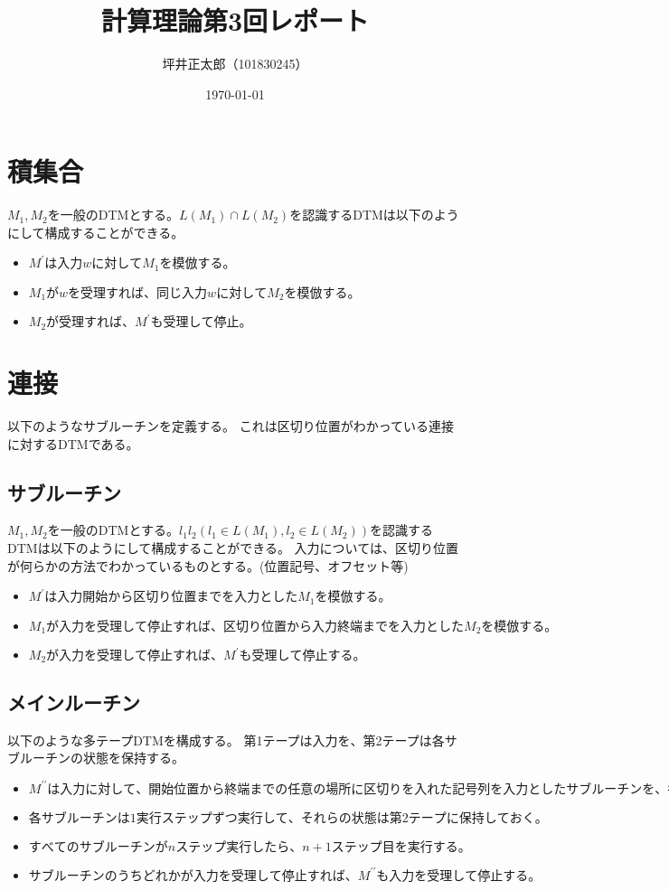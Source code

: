 \documentclass[a4paper,10pt]{jsarticle}
\begin{document}
\title{計算理論第3回レポート}
\author{坪井正太郎（101830245）}
\date{\today}
\maketitle
\section{積集合}
$M_1, M_2$を一般のDTMとする。$L(M_1)\cap L(M_2)$を認識するDTMは以下のようにして構成することができる。
\begin{itemize}
  \item $M^\prime は入力wに対してM_1を模倣する。$
  \item $M_1がwを受理すれば、同じ入力wに対してM_2を模倣する。$
  \item $M_2が受理すれば、M^\prime も受理して停止。$
\end{itemize}

\section{連接}
以下のようなサブルーチンを定義する。
これは区切り位置がわかっている連接に対するDTMである。
\subsection{サブルーチン}
$M_1, M_2$を一般のDTMとする。$l_1l_2(l_1\in L(M_1), l_2\in L(M_2))$を認識するDTMは以下のようにして構成することができる。
入力については、区切り位置が何らかの方法でわかっているものとする。(位置記号、オフセット等)
\begin{itemize}
  \item $M^\prime は入力開始から区切り位置までを入力としたM_1を模倣する。$
  \item $M_1が入力を受理して停止すれば、区切り位置から入力終端までを入力としたM_2を模倣する。$
  \item $M_2が入力を受理して停止すれば、M^\prime も受理して停止する。$
\end{itemize}

\subsection{メインルーチン}
以下のような多テープDTMを構成する。
第1テープは入力を、第2テープは各サブルーチンの状態を保持する。
\begin{itemize}
  \item $M^{\prime\prime} は入力に対して、開始位置から終端までの任意の場所に区切りを入れた記号列を入力としたサブルーチンを、考えられる区切り位置の数だけ呼び出す$
  \item $各サブルーチンは1実行ステップずつ実行して、それらの状態は第2テープに保持しておく。$
  \item $すべてのサブルーチンがnステップ実行したら、n+1ステップ目を実行する。$
  \item $サブルーチンのうちどれかが入力を受理して停止すれば、M^{\prime\prime}も入力を受理して停止する。$
\end{itemize}
\end{document}
